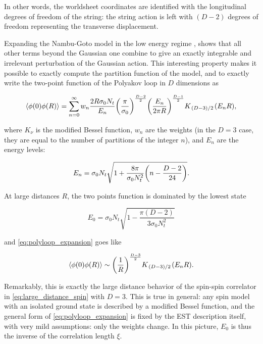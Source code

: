 \documentclass[reqno,12pt]{article}
\numberwithin{equation}{section}
\begin{document}
In other words, the worldsheet coordinates are identified with the longitudinal degrees of freedom of the string: the string action is left with
$(D-2)$ degrees of freedom representing the transverse displacement. 

Expanding the Nambu-Goto model in the low energy regime \cite{caselle}, shows that all other terms
beyond the Gaussian one combine to give an exactly integrable and irrelevant perturbation of the Gaussian action.
This interesting property makes it possible to exactly compute the partition function of the model, and to exactly write the two-point
function of the Polyakov loop in $D$ dimensions as

\begin{equation} \label{eq:polyloop_expansion}
	\expval{\phi(0) \phi(R)} = 
	\sum_{n=0}^{\infty} w_n \frac{2R\sigma_0N_t}{E_n} \qty(\frac{\pi}{\sigma_0})^{\frac{D-2}{2}} 
	\qty(\frac{E_n}{2\pi R})^{\frac{D-1}{2}} K_{\flatfrac{(D-3)}{2}}(E_n R),
\end{equation}

where $K_\nu$ is the modified Bessel function, $w_n$ are the weights (in the $D=3$ case, they are equal to the number of partitions
of the integer $n$), and $E_n$ are the energy levels:

\begin{equation}
	E_n = \sigma_0 N_t \sqrt{1 + \frac{8\pi}{\sigma_0 N_t^2}\qty(n - \frac{D-2}{24})}.
\end{equation}

At large distances $R$, the two points function is dominated by the lowest state

\begin{equation}
	E_0 = \sigma_0 N_t \sqrt{1 - \frac{\pi(D - 2)}{3\sigma_0 N_t^2}}
\end{equation}

and \eqref{eq:polyloop_expansion} goes like

\begin{equation} \label{eq:est_polyloop_corr}
	\expval{\phi(0) \phi(R)} \sim \qty(\frac{1}{R})^{\frac{D-3}{2}} K_{\flatfrac{(D-3)}{2}}(E_n R).
\end{equation}

Remarkably, this is exactly the large distance behavior of the spin-spin correlator in \eqref{eq:large_distance_spin}
with $D = 3$.
This is true in general: any spin model with an isolated ground state is described
by a modified Bessel function, and the general form of \eqref{eq:polyloop_expansion} is fixed by the EST description itself,
with very mild assumptions: only the weights change.
In this picture, $E_0$ is thus the inverse of the correlation length $\xi$. 
\end{document}
